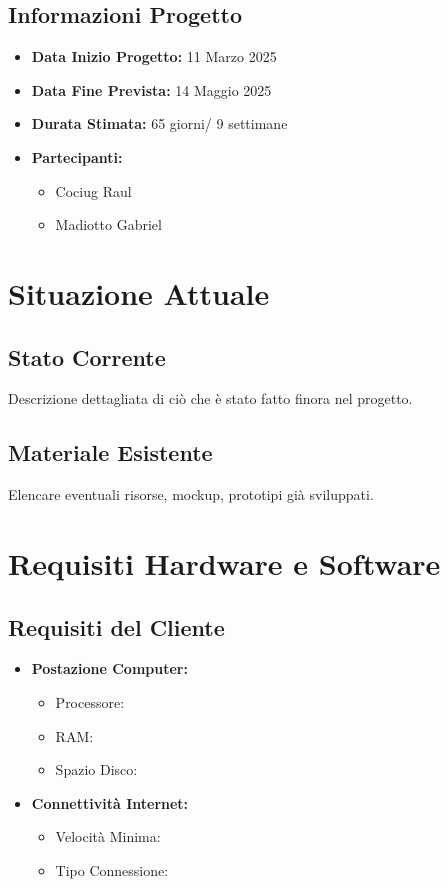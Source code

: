 \documentclass[a4paper,12pt]{article}
\begin{document}
\subsection{Informazioni Progetto}
\begin{itemize}
    \item \textbf{Data Inizio Progetto:} 11 Marzo 2025
    \item \textbf{Data Fine Prevista:} 14 Maggio 2025
    \item \textbf{Durata Stimata:} 65 giorni/ 9 settimane
    \item \textbf{Partecipanti:}
    \begin{itemize}
        \item Cociug Raul
        \item Madiotto Gabriel
    \end{itemize}
\end{itemize}

\section{Situazione Attuale}
\subsection{Stato Corrente}
Descrizione dettagliata di ciò che è stato fatto finora nel progetto.

\subsection{Materiale Esistente}
Elencare eventuali risorse, mockup, prototipi già sviluppati.

\section{Requisiti Hardware e Software}
\subsection{Requisiti del Cliente}
\begin{itemize}
    \item \textbf{Postazione Computer:}
    \begin{itemize}
        \item Processore: 
        \item RAM: 
        \item Spazio Disco:
    \end{itemize}
    
    \item \textbf{Connettività Internet:}
    \begin{itemize}
        \item Velocità Minima:
        \item Tipo Connessione:
    \end{itemize}
\end{itemize}
\end{document}
